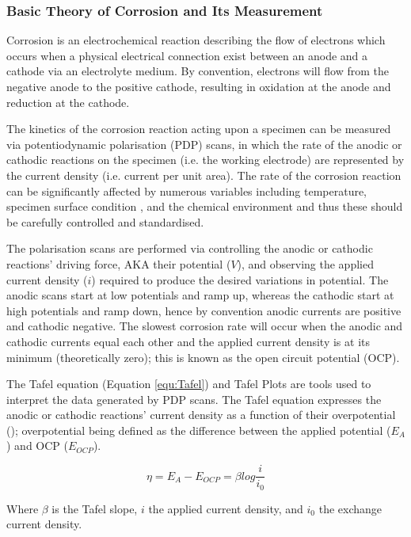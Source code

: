 \documentclass[draft,a4paper,12pt,oneside]{report}%
\begin{document}
\subsubsection{Basic Theory of Corrosion and Its Measurement}
Corrosion is an electrochemical reaction describing the flow of electrons which occurs when a physical electrical connection exist between an anode and a cathode via an electrolyte medium. By convention, electrons will flow from the negative anode to the positive cathode, resulting in oxidation at the anode and reduction at the cathode. 

The kinetics of the corrosion reaction acting upon a specimen can be measured via potentiodynamic polarisation (PDP) scans, in which the rate of the anodic or cathodic reactions on the specimen (i.e. the working electrode) are represented by the current density (i.e. current per unit area). The rate of the corrosion reaction can be significantly affected by numerous variables including temperature, specimen surface condition \cite{Jones1992}, and the chemical environment and thus these should be carefully controlled and standardised. 

The polarisation scans are performed via controlling the anodic or cathodic reactions' driving force, AKA their potential ($V$), and observing the applied current density ($i$) required to produce the desired variations in potential. The anodic scans start at low potentials and ramp up, whereas the cathodic start at high potentials and ramp down, hence by convention anodic currents are positive and cathodic negative. The slowest corrosion rate will occur when the anodic and cathodic currents equal each other and the applied current density is at its minimum (theoretically zero); this is known as the open circuit potential (OCP). 

The Tafel equation (Equation \ref{equ:Tafel}) and Tafel Plots are tools used to interpret the data generated by PDP scans. The Tafel equation expresses the anodic or cathodic reactions' current density as a function of their overpotential (\n); overpotential being defined as the difference between the applied potential ($E_{A}$) and OCP ($E_{OCP}$).  

\begin{equation}
\eta = E_{A} - E_{OCP}=\beta log \frac{i}{i_{0}}
\label{equ:Tafel}
\end{equation}

Where $\beta$ is the Tafel slope, $i$ the applied current density, and $i_{0}$ the exchange current density. 
\end{document}
